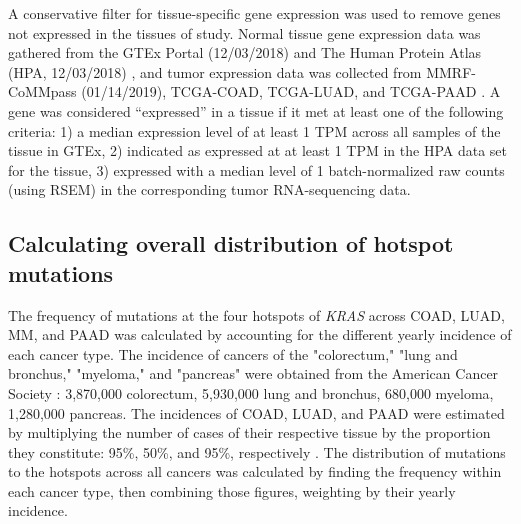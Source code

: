 \documentclass[english, 10pt, letterpaper]{article}
\newcommand{\KRAS}{\emph{KRAS}}
\begin{document}
A conservative filter for tissue-specific gene expression was used to remove genes not expressed in the tissues of study. 
Normal tissue gene expression data was gathered from the GTEx Portal (12/03/2018) \cite{GTExConsortium2017} and The Human Protein Atlas (HPA, 12/03/2018) \cite{Uhlen2015, Uhlen2016}, and tumor expression data was collected from MMRF-CoMMpass (01/14/2019), TCGA-COAD, TCGA-LUAD, and TCGA-PAAD \cite{Walker2019AAnalysis., CancerGenomeAtlasNetwork2012, CancerGenomeAtlasResearchNetwork2014, CancerGenomeAtlasResearchNetwork.Electronicaddress:andrew_aguirredfci.harvard.edu2017}. 
A gene was considered “expressed” in a tissue if it met at least one of the following criteria: 1) a median expression level of at least 1 TPM across all samples of the tissue in GTEx, 2) indicated as expressed at at least 1 TPM in the HPA data set for the tissue, 3) expressed with a median level of 1 batch-normalized raw counts (using RSEM) in the corresponding tumor RNA-sequencing data.


\subsection*{Calculating overall distribution of hotspot mutations}
The frequency of mutations at the four hotspots of \KRAS{} across COAD, LUAD, MM, and PAAD was calculated by accounting for the different yearly incidence of each cancer type.
The incidence of cancers of the "colorectum," "lung and bronchus," "myeloma," and "pancreas" were obtained from the American Cancer Society \cite{Siegel2020Cancer2020.}: 3,870,000 colorectum, 5,930,000 lung and bronchus, 680,000 myeloma, 1,280,000 pancreas.
The incidences of COAD, LUAD, and PAAD were estimated by multiplying the number of cases of their respective tissue by the proportion they constitute: 95\%, 50\%, and 95\%, respectively \cite{Siegel2020Cancer2020., Meza2015Lung1973-2010.}.
The distribution of mutations to the hotspots across all cancers was calculated by finding the frequency within each cancer type, then combining those figures, weighting by their yearly incidence.



\end{document}
